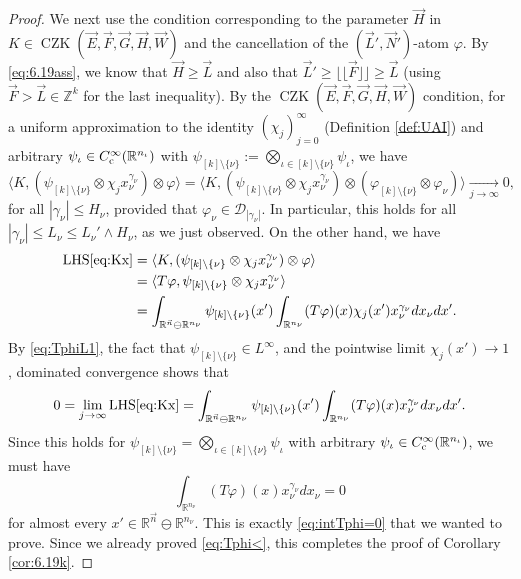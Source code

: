 \documentclass[11pt, reqno]{amsart}
\theoremstyle{definition}
\theoremstyle{remark}
\numberwithin{equation}{section}
\newcommand{\vE}{\vec E}
\newcommand{\vF}{\vec F}
\newcommand{\R}{\mathbb R}
\newcommand{\Z}{\mathbb Z}
\newcommand{\vn}{\vec n}
\newcommand{\Floor}[1]{\lfloor\!\lfloor #1 \rfloor\!\rfloor}
\newcommand{\pair}[2]{\langle #1, #2 \rangle}
\newcommand{\abs}[1]{|#1|}
\begin{document}
\begin{proof}
We next use the condition corresponding to the parameter $\vec H$ in $K\in\operatorname{CZK}(\vE,\vF,\vec G,\vec H,\vec W)$ and the cancellation of the $(\vec L',\vec N')$-atom $\varphi$. By \eqref{eq:6.19ass}, we know that $\vec H\geq\vec L$ and also that $\vec L'\geq\Floor{\vec F}\geq\vec L$ (using $\vec F>\vec L\in\Z^k$ for the last inequality). By the $\operatorname{CZK}(\vE,\vF,\vec G,\vec H,\vec W)$ condition, for a  uniform approximation to the identity  $(\chi_j)_{j=0}^\infty$ (Definition \ref{def:UAI}) and arbitrary $\psi_\iota\in C_{\rm c}^\infty(\R^{n_\iota})$ with $\psi_{[k]\setminus\{\nu\}}:=\bigotimes_{\iota\in[k]\setminus\{\nu\}}\psi_\iota$, we have
\begin{equation}\label{eq:Kx}
  \pair{K}{(\psi_{[k]\setminus\{\nu\}}\otimes\chi_j x_\nu^{\gamma_\nu})\otimes\varphi}
  =\pair{K}{(\psi_{[k]\setminus\{\nu\}}\otimes\chi_j x_\nu^{\gamma_\nu})\otimes(\varphi_{[k]\setminus\{\nu\}}\otimes\varphi_{\nu})}
  \underset{j\to\infty}{\longrightarrow} 0,
\end{equation}
for all $\abs{\gamma_\nu}\leq H_\nu$, provided that $\varphi_{\nu}\in\mathcal D_{\abs{\gamma_\nu}}$. In particular, this holds for all $\abs{\gamma_\nu}\leq L_\nu\leq L_{\nu}'\wedge H_\nu$, as we just observed. On the other hand, we have
\begin{equation*}
\begin{split}
  \mathrm{LHS}\eqref{eq:Kx} &=\pair{K}{(\psi_{[k]\setminus\{\nu\}}\otimes\chi_j x_\nu^{\gamma_\nu})\otimes\varphi} \\
  &=\pair{T\varphi}{\psi_{[k]\setminus\{\nu\}}\otimes\chi_j x_\nu^{\gamma_\nu}} \\
  &=\int_{\R^{\vn}\ominus\R^{n_\nu}} \psi_{[k]\setminus\{\nu\}}(x')\int_{\R^{n_\nu}}(T\varphi)(x) \chi_j(x') x_\nu^{\gamma_\nu}dx_{\nu}dx'.
\end{split}
\end{equation*}
By \eqref{eq:TphiL1}, the fact that $\psi_{[k]\setminus\{\nu\}}\in L^\infty$, and the pointwise limit $\chi_j(x')\to 1$, dominated convergence shows that
\begin{equation*}
  0=\lim_{j\to\infty}\mathrm{LHS}\eqref{eq:Kx}
  =\int_{\R^{\vn}\ominus\R^{n_\nu}} \psi_{[k]\setminus\{\nu\}}(x')\int_{\R^{n_\nu}}(T\varphi)(x)  x_\nu^{\gamma_\nu}dx_{\nu}dx'.
\end{equation*}
Since this holds for $\psi_{[k]\setminus\{\nu\}}=\bigotimes_{\iota\in[k]\setminus\{\nu\}} \psi_{\iota}$ with arbitrary $\psi_{\iota}\in C_{\rm c}^\infty(\R^{n_\iota})$, we must have
\begin{equation*}
  \int_{\R^{n_\nu}}(T\varphi)(x) x_\nu^{\gamma_\nu}dx_{\nu}=0
\end{equation*}
for almost every $x'\in\R^{\vn}\ominus\R^{n_\nu}$. This is exactly \eqref{eq:intTphi=0} that we wanted to prove. Since we already proved \eqref{eq:Tphi<}, this completes the proof of Corollary \ref{cor:6.19k}.
\end{proof}
\end{document}
